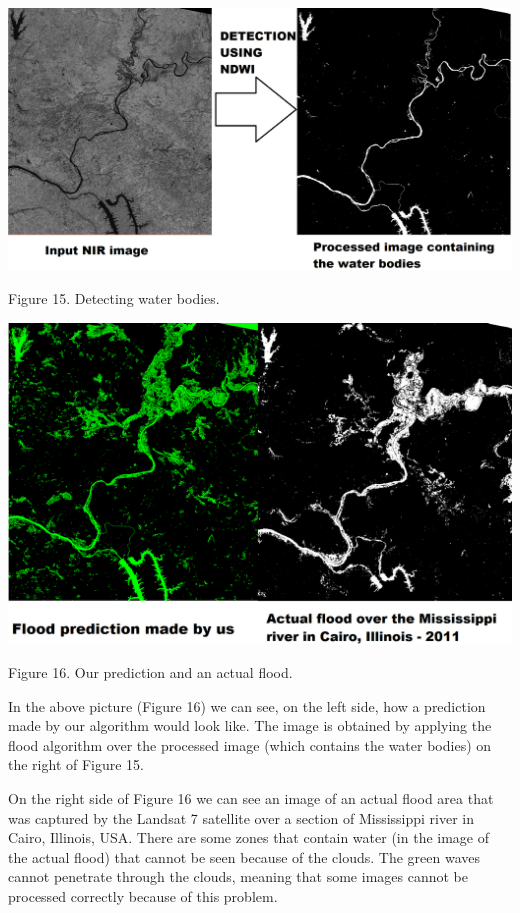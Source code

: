 \documentclass[12pt, a4paper]{report}
\begin{document}
\bigskip
\includegraphics[scale=0.3, left]{process1.png}
\begin{center}
Figure 15. Detecting water bodies.
\end{center}
\par 

\includegraphics[scale=0.4, center]{process3.png}
\begin{center}
Figure 16. Our prediction and an actual flood.
\end{center}
\par 

In the above picture (Figure 16) we can see, on the left side, how a prediction made by our algorithm would look like. The image is obtained by applying the flood algorithm over the processed image (which contains the water bodies) on the right of Figure 15. \par 

On the right side of Figure 16 we can see an image of an actual flood area that was captured by the Landsat 7 satellite over a section of Mississippi river in Cairo, Illinois, USA. There are some zones  that contain water (in the image of the actual flood) that cannot be seen because of the clouds. The green waves cannot penetrate through the clouds, meaning that some images cannot be processed correctly because of this problem.
\par 
\end{document}
